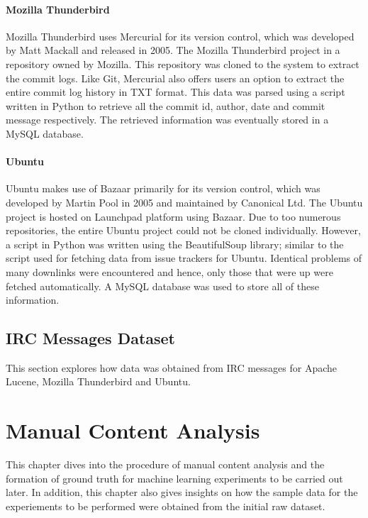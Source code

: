\documentclass[a4paper,12pt,twoside]{report}
\begin{document}
\subsubsection{Mozilla Thunderbird}
Mozilla Thunderbird uses Mercurial for its version control, which was developed by Matt Mackall and released in 2005. The Mozilla Thunderbird project in a repository owned by Mozilla. This repository was cloned to the system to extract the commit logs. Like Git, Mercurial also offers users an option to extract the entire commit log history in TXT format. This data was parsed using a script written in Python to retrieve all the commit id, author, date and commit message respectively. The retrieved information was eventually stored in a MySQL database. 

\subsubsection{Ubuntu}
Ubuntu makes use of Bazaar primarily for its version control, which was developed by Martin Pool in 2005 and maintained by Canonical Ltd. The Ubuntu project is hosted on Launchpad platform using Bazaar. Due to too numerous repositories, the entire Ubuntu project could not be cloned individually. However, a script in Python was written using the BeautifulSoup library; similar to the script used for fetching data from issue trackers for Ubuntu. Identical problems of many downlinks were encountered and hence, only those that were up were fetched automatically. A MySQL database was used to store all of these information. 

\section{IRC Messages Dataset}

This section explores how data was obtained from IRC messages for Apache Lucene, Mozilla Thunderbird and Ubuntu. 


\chapter{Manual Content Analysis}

This chapter dives into the procedure of manual content analysis and the formation of ground truth for machine learning experiments to be carried out later. In addition, this chapter also gives insights on how the sample data for the experiements to be performed were obtained from the initial raw dataset. 
\end{document}
